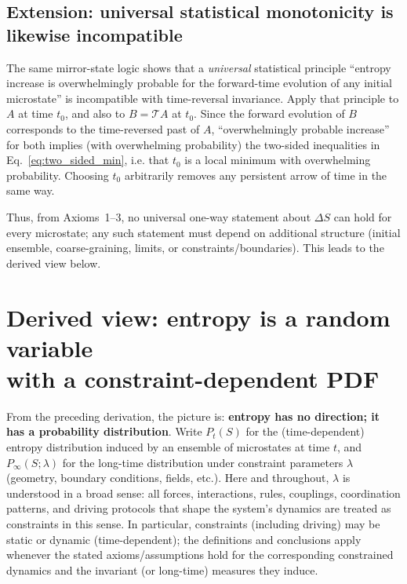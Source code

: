 \documentclass[11pt,a4paper]{article}
\begin{document}
\subsection{Extension: universal statistical monotonicity is likewise incompatible}
\label{sec:stat}

The same mirror-state logic shows that a \emph{universal} statistical principle
``entropy increase is overwhelmingly probable for the forward-time evolution of
any initial microstate'' is incompatible with time-reversal invariance. Apply
that principle to $A$ at time $t_0$, and also to $B=\mathcal{T}A$ at $t_0$. Since
the forward evolution of $B$ corresponds to the time-reversed past of $A$,
``overwhelmingly probable increase'' for both implies (with overwhelming probability)
the two-sided inequalities in Eq.~\eqref{eq:two_sided_min}, i.e. that $t_0$ is a
local minimum with overwhelming probability. Choosing $t_0$ arbitrarily removes any
persistent arrow of time in the same way.

Thus, from Axioms~1--3, no universal one-way statement about $\Delta S$ can hold
for every microstate; any such statement must depend on additional structure
(initial ensemble, coarse-graining, limits, or constraints/boundaries). This
leads to the derived view below.

\section{Derived view: entropy is a random variable\\with a constraint-dependent PDF}
\label{sec:corrected}

From the preceding derivation, the picture is:
\textbf{entropy has no direction; it has a probability distribution}.
Write $P_t(S)$ for the (time-dependent) entropy distribution induced by an
ensemble of microstates at time $t$, and $P_{\infty}(S;\lambda)$ for the long-time
distribution under constraint parameters $\lambda$ (geometry, boundary conditions,
fields, etc.). Here and throughout, $\lambda$ is understood in a broad sense: all
forces, interactions, rules, couplings, coordination patterns, and driving
protocols that shape the system's dynamics are treated as constraints in this
sense. In particular, constraints (including driving) may be static or dynamic
(time-dependent); the definitions and conclusions apply whenever the stated
axioms/assumptions hold for the corresponding constrained dynamics and the
invariant (or long-time) measures they induce.
\end{document}
